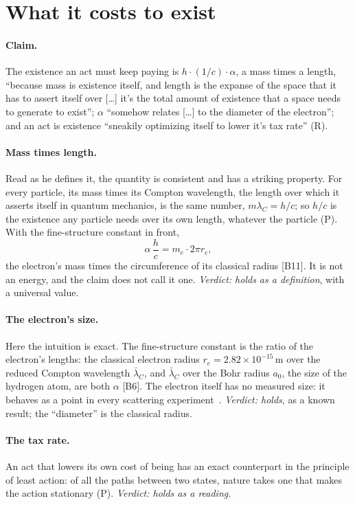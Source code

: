 \documentclass[11pt,a4paper]{article}
\theoremstyle{definition}
\newcommand{\chk}[1]{\textsf{[#1]}}
\newcommand{\tagR}{\textsf{(R)}}
\newcommand{\tagP}{\textsf{(P)}}
\begin{document}
\section{What it costs to exist}\label{sec:cost}

\paragraph{Claim.} The existence an act must keep paying is $h\cdot(1/c)\cdot\alpha$, a mass times a length, ``because mass is existence
itself, and length is the expanse of the space that it has to assert itself over [\dots] it's the total amount of existence that a space
needs to generate to exist''; $\alpha$ ``somehow relates [\dots] to the diameter of the electron''; and an act is existence ``sneakily
optimizing itself to lower it's tax rate'' \tagR.

\paragraph{Mass times length.} Read as he defines it, the quantity is consistent and has a striking property. For every particle, its mass
times its Compton wavelength, the length over which it asserts itself in quantum mechanics, is the same number, $m\lambda_C=h/c$; so $h/c$ is
the existence any particle needs over its own length, whatever the particle \tagP. With the fine-structure constant in front,
\[
\alpha\,\frac{h}{c}=m_e\cdot2\pi r_e ,
\]
the electron's mass times the circumference of its classical radius \chk{B11}. It is not an energy, and the claim does not call it one.
\emph{Verdict: holds as a definition}, with a universal value.

\paragraph{The electron's size.} Here the intuition is exact. The fine-structure constant is the ratio of the electron's lengths: the
classical electron radius $r_e=2.82\times10^{-15}$\,m over the reduced Compton wavelength $\bar\lambda_C$, and $\bar\lambda_C$ over the Bohr
radius $a_0$, the size of the hydrogen atom, are both $\alpha$ \chk{B6}. The electron itself has no measured size: it behaves as a point in
every scattering experiment~\cite{pdg}. \emph{Verdict: holds}, as a known result; the ``diameter'' is the classical radius.

\paragraph{The tax rate.} An act that lowers its own cost of being has an exact counterpart in the principle of least action: of all the
paths between two states, nature takes one that makes the action stationary \tagP. \emph{Verdict: holds as a reading.}
\end{document}
